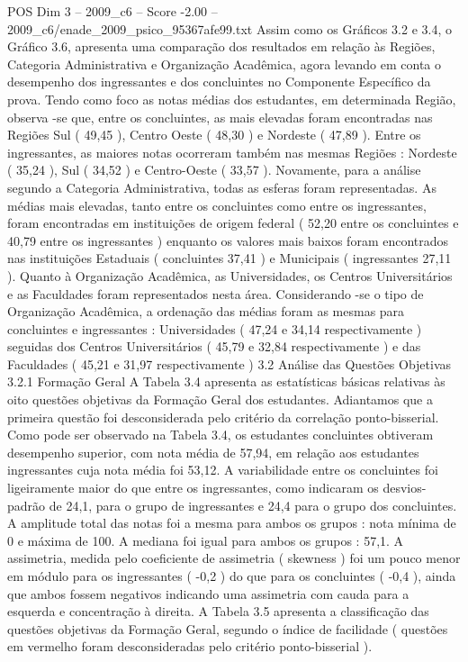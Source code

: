 \begin{textsample}{POS Dim 3 – 2009\_c6 – Score -2.00 – 2009\_c6/enade\_2009\_psico\_95367afe99.txt}
Assim como os Gráficos 3.2 e 3.4, o Gráfico 3.6, apresenta uma comparação dos resultados em relação às Regiões, Categoria Administrativa e Organização Acadêmica, agora levando em conta o desempenho dos ingressantes e dos concluintes no Componente Específico da prova.
Tendo como foco as notas médias dos estudantes, em determinada Região, observa -se que, entre os concluintes, as mais elevadas foram encontradas nas Regiões Sul ( 49,45 ), Centro Oeste ( 48,30 ) e Nordeste ( 47,89 ).
Entre os ingressantes, as maiores notas ocorreram também nas mesmas Regiões : Nordeste ( 35,24 ), Sul ( 34,52 ) e Centro-Oeste ( 33,57 ).
Novamente, para a análise segundo a Categoria Administrativa, todas as esferas foram representadas.
As médias mais elevadas, tanto entre os concluintes como entre os ingressantes, foram encontradas em instituições de origem federal ( 52,20 entre os concluintes e 40,79 entre os ingressantes ) enquanto os valores mais baixos foram encontrados nas instituições Estaduais ( concluintes 37,41 ) e Municipais ( ingressantes 27,11 ).
Quanto à Organização Acadêmica, as Universidades, os Centros Universitários e as Faculdades foram representados nesta área.
Considerando -se o tipo de Organização Acadêmica, a ordenação das médias foram as mesmas para concluintes e ingressantes : Universidades ( 47,24 e 34,14 respectivamente ) seguidas dos Centros Universitários ( 45,79 e 32,84 respectivamente ) e das Faculdades ( 45,21 e 31,97 respectivamente ) 3.2 Análise das Questões Objetivas 3.2.1 Formação Geral A Tabela 3.4 apresenta as estatísticas básicas relativas às oito questões objetivas da Formação Geral dos estudantes.
Adiantamos que a primeira questão foi desconsiderada pelo critério da correlação ponto-bisserial.
Como pode ser observado na Tabela 3.4, os estudantes concluintes obtiveram desempenho superior, com nota média de 57,94, em relação aos estudantes ingressantes cuja nota média foi 53,12.
A variabilidade entre os concluintes foi ligeiramente maior do que entre os ingressantes, como indicaram os desvios-padrão de 24,1, para o grupo de ingressantes e 24,4 para o grupo dos concluintes.
A amplitude total das notas foi a mesma para ambos os grupos : nota mínima de 0 e máxima de 100.
A mediana foi igual para ambos os grupos : 57,1.
A assimetria, medida pelo coeficiente de assimetria ( skewness ) foi um pouco menor em módulo para os ingressantes ( -0,2 ) do que para os concluintes ( -0,4 ), ainda que ambos fossem negativos indicando uma assimetria com cauda para a esquerda e concentração à direita.
A Tabela 3.5 apresenta a classificação das questões objetivas da Formação Geral, segundo o índice de facilidade ( questões em vermelho foram desconsideradas pelo critério ponto-bisserial ).

\end{textsample}
